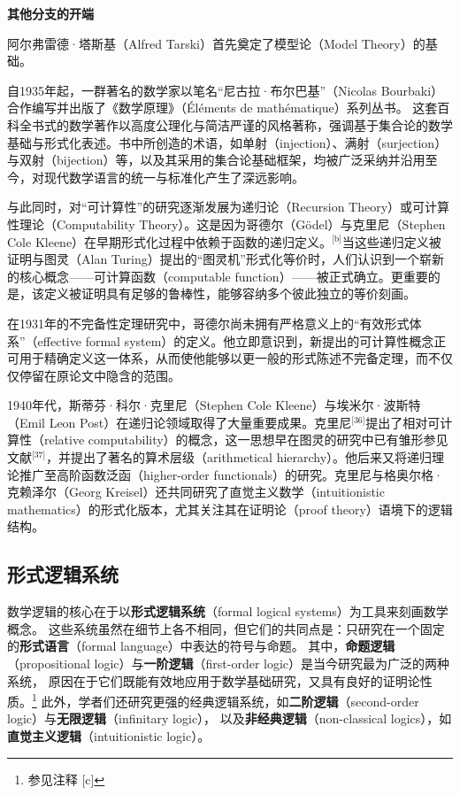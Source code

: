 \textbf{其他分支的开端}

阿尔弗雷德·塔斯基（Alfred Tarski）首先奠定了模型论（Model Theory）的基础。

自1935年起，一群著名的数学家以笔名“尼古拉·布尔巴基”（Nicolas Bourbaki）合作编写并出版了《数学原理》（Éléments de mathématique）系列丛书。  这套百科全书式的数学著作以高度公理化与简洁严谨的风格著称，强调基于集合论的数学基础与形式化表述。书中所创造的术语，如单射（injection）、满射（surjection）与双射（bijection）等，以及其采用的集合论基础框架，均被广泛采纳并沿用至今，对现代数学语言的统一与标准化产生了深远影响。

与此同时，对“可计算性”的研究逐渐发展为递归论（Recursion Theory）或可计算性理论（Computability Theory）。这是因为哥德尔（Gödel）与克里尼（Stephen Cole Kleene）在早期形式化过程中依赖于函数的递归定义。\(^\text{[b]}\)当这些递归定义被证明与图灵（Alan Turing）提出的“图灵机”形式化等价时，人们认识到一个崭新的核心概念——可计算函数（computable function）——被正式确立。更重要的是，该定义被证明具有足够的鲁棒性，能够容纳多个彼此独立的等价刻画。

在1931年的不完备性定理研究中，哥德尔尚未拥有严格意义上的“有效形式体系”（effective formal system）的定义。他立即意识到，新提出的可计算性概念正可用于精确定义这一体系，从而使他能够以更一般的形式陈述不完备定理，而不仅仅停留在原论文中隐含的范围。

1940年代，斯蒂芬·科尔·克里尼（Stephen Cole Kleene）与埃米尔·波斯特（Emil Leon Post）在递归论领域取得了大量重要成果。克里尼\(^\text{[36]}\)提出了相对可计算性（relative computability）的概念，这一思想早在图灵的研究中已有雏形参见文献\(^\text{[37]}\)，并提出了著名的算术层级（arithmetical hierarchy）。他后来又将递归理论推广至高阶函数泛函（higher-order functionals）的研究。克里尼与格奥尔格·克赖泽尔（Georg Kreisel）还共同研究了直觉主义数学（intuitionistic mathematics）的形式化版本，尤其关注其在证明论（proof theory）语境下的逻辑结构。
\subsection{形式逻辑系统}
数学逻辑的核心在于以\textbf{形式逻辑系统}（formal logical systems）为工具来刻画数学概念。  
这些系统虽然在细节上各不相同，但它们的共同点是：只研究在一个固定的\textbf{形式语言}（formal language）中表达的符号与命题。  
其中，\textbf{命题逻辑}（propositional logic）与\textbf{一阶逻辑}（first-order logic）是当今研究最为广泛的两种系统，  
原因在于它们既能有效地应用于数学基础研究，又具有良好的证明论性质。\footnote{参见注释 [c]}  
此外，学者们还研究更强的经典逻辑系统，如\textbf{二阶逻辑}（second-order logic）与\textbf{无限逻辑}（infinitary logic），  
以及\textbf{非经典逻辑}（non-classical logics），如\textbf{直觉主义逻辑}（intuitionistic logic）。

